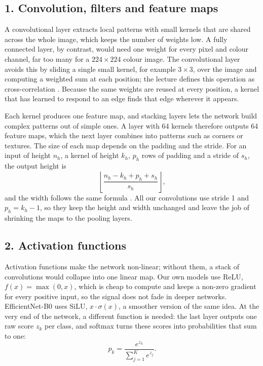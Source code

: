 \documentclass{article}
\begin{document}
\subsection{1. Convolution, filters and feature maps}

A convolutional layer extracts local patterns with small kernels that are shared across the whole image, which keeps the number of weights low. A fully connected layer, by contrast, would need one weight for every pixel and colour channel, far too many for a $224\times224$ colour image. The convolutional layer avoids this by sliding a single small kernel, for example $3\times3$, over the image and computing a weighted sum at each position; the lecture defines this operation as cross-correlation \cite{lec51}. Because the same weights are reused at every position, a kernel that has learned to respond to an edge finds that edge wherever it appears.

Each kernel produces one feature map, and stacking layers lets the network build complex patterns out of simple ones. A layer with 64 kernels therefore outputs 64 feature maps, which the next layer combines into patterns such as corners or textures. The size of each map depends on the padding and the stride. For an input of height $n_h$, a kernel of height $k_h$, $p_h$ rows of padding and a stride of $s_h$, the output height is
\begin{equation}
  \left\lfloor \frac{n_h - k_h + p_h + s_h}{s_h} \right\rfloor ,
\end{equation}
and the width follows the same formula \cite{lec51}. All our convolutions use stride 1 and $p_h = k_h - 1$, so they keep the height and width unchanged and leave the job of shrinking the maps to the pooling layers.

\subsection{2. Activation functions}

Activation functions make the network non-linear; without them, a stack of convolutions would collapse into one linear map. Our own models use ReLU, $f(x)=\max(0,x)$, which is cheap to compute and keeps a non-zero gradient for every positive input, so the signal does not fade in deeper networks. EfficientNet-B0 uses SiLU, $x\cdot\sigma(x)$, a smoother version of the same idea. At the very end of the network, a different function is needed: the last layer outputs one raw score $z_k$ per class, and softmax turns these scores into probabilities that sum to one:
\begin{equation}
  p_k = \frac{e^{z_k}}{\sum_{j=1}^{K} e^{z_j}} .
\end{equation}
\end{document}
